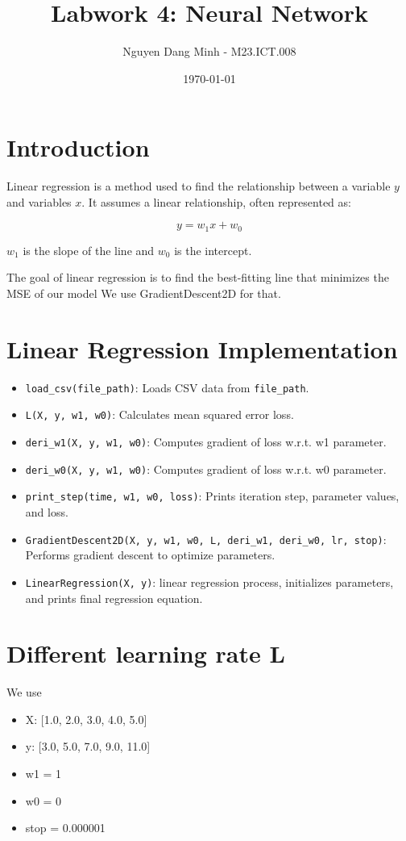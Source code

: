\documentclass{article}
\title{Labwork 4: Neural Network}
\author{Nguyen Dang Minh - M23.ICT.008}
\date{\today}
\begin{document}
\maketitle

\section{Introduction}

Linear regression is a method used to find the relationship between a variable \( y \) and variables \( x \). It assumes a linear relationship, often represented as:

\[ y = w_1x + w_0 \]

\( w_1 \) is the slope of the line and \( w_0 \) is the intercept. 

The goal of linear regression is to find the best-fitting line that minimizes the MSE of our model 
We use GradientDescent2D for that.

\section{Linear Regression Implementation}

\begin{itemize}
    \item \texttt{load\_csv(file\_path)}: Loads CSV data from \texttt{file\_path}.
    \item \texttt{L(X, y, w1, w0)}: Calculates mean squared error loss.
    \item \texttt{deri\_w1(X, y, w1, w0)}: Computes gradient of loss w.r.t. w1 parameter.
    \item \texttt{deri\_w0(X, y, w1, w0)}: Computes gradient of loss w.r.t. w0 parameter.
    \item \texttt{print\_step(time, w1, w0, loss)}: Prints iteration step, parameter values, and loss.
    \item \texttt{GradientDescent2D(X, y, w1, w0, L, deri\_w1, deri\_w0, lr, stop)}: Performs gradient descent to optimize parameters.
    \item \texttt{LinearRegression(X, y)}: linear regression process, initializes parameters, and prints final regression equation.
\end{itemize}

\section{Different learning rate L}
We use 
\begin{itemize}
    \item X: [1.0, 2.0, 3.0, 4.0, 5.0]
    \item y: [3.0, 5.0, 7.0, 9.0, 11.0]
    \item w1 = 1
    \item w0 = 0
    \item stop = 0.000001
\end{itemize}
\end{document}
